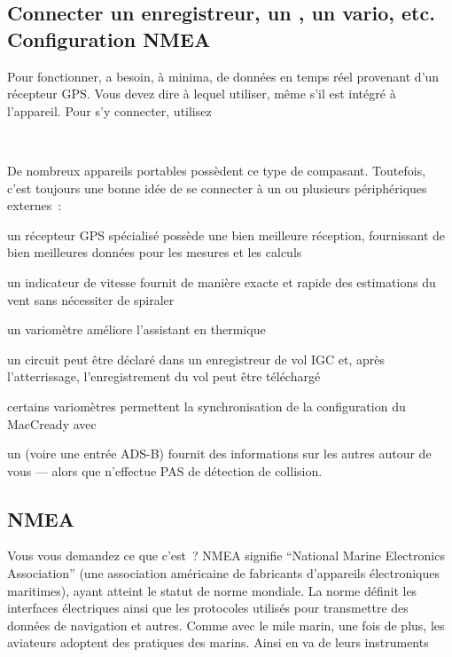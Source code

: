 \documentclass[french, a4paper, 12pt]{refrep}
\renewcommand{\config}[3]{\bmenut{Config}{#1/3}{\LARGE$\triangleright$}~\bmenut{#2}{#3}}%
\begin{document}
\subsection{\textcolor{flashblue}{Connecter un enregistreur, un \fl, un vario, etc. Configuration NMEA}}

Pour fonctionner, \xc{} a besoin, à minima, de données en temps réel provenant d'un récepteur GPS. Vous devez dire à 
\xc{} lequel utiliser, même s'il est intégré à l'appareil. Pour s'y connecter, utilisez
\begin{flushleft}\hspace*{1cm}\config{2}{Périph.}{}\blink{}\\\end{flushleft}
De nombreux appareils portables possèdent ce type de compasant. Toutefois, c'est toujours
une bonne idée de se connecter à un ou plusieurs périphériques externes~:
\begin{compactitem}
\item un récepteur GPS spécialisé possède une bien meilleure réception, fournissant de bien
meilleures données pour les mesures et les calculs
\item un indicateur de vitesse fournit de manière exacte et rapide des estimations du vent
sans nécessiter de spiraler
\item un variomètre améliore l'assistant en thermique
\item un circuit peut être déclaré dans un enregistreur de vol IGC et, après l'atterrissage, l'enregistrement
du vol peut être téléchargé
\item certains variomètres permettent la synchronisation de la configuration du MacCready avec
\xc
\item un \fl{} (voire une entrée ADS-B) fournit des informations sur les autres
autour de vous --- alors que \xc{} n'effectue PAS de détection de collision.
\end{compactitem}

\subsection{\textcolor{flashblue}{NMEA}}
Vous vous demandez ce que c'est~? NMEA signifie ``National Marine Electronics Association'' (une association américaine de fabricants d'appareils électroniques maritimes), ayant
atteint le statut de norme mondiale. La norme définit les interfaces électriques
ainsi que les protocoles utilisés pour transmettre des données de navigation et
autres. Comme avec le mile marin, une fois de plus, les aviateurs adoptent des pratiques des marins.
Ainsi en va de leurs instruments\textellipsis
\end{document}
